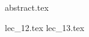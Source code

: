 \documentclass[a4paper,german, git, fancyfoot]{mkessler-script}
\author{Maximilian Keßler}
\begin{document}
    \maketitle

    {abstract.tex}


    \newpage
    \tableofcontents

    \newpage
    \summaryoflectures


    \newpage
    {lec_12.tex}
    {lec_13.tex}
    \printindex
\end{document}
